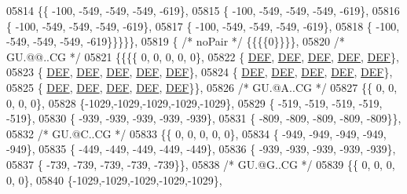 \begin{DoxyCode}
05814 \{\{ -100, -549, -549, -549, -619\},
05815 \{ -100, -549, -549, -549, -619\},
05816 \{ -100, -549, -549, -549, -619\},
05817 \{ -100, -549, -549, -549, -619\},
05818 \{ -100, -549, -549, -549, -619\}\}\}\}\},
05819 \{ \textcolor{comment}{/* noPair */} \{\{\{\{0\}\}\}\},
05820 \textcolor{comment}{/* GU.@@..CG */}
05821 \{\{\{\{    0,    0,    0,    0,    0\},
05822 \{  \mbox{\hyperlink{1_88_84__epars_8h_a397419fc12b37ed479c8abb9d444d843}{DEF}},  \mbox{\hyperlink{1_88_84__epars_8h_a397419fc12b37ed479c8abb9d444d843}{DEF}},  \mbox{\hyperlink{1_88_84__epars_8h_a397419fc12b37ed479c8abb9d444d843}{DEF}},  \mbox{\hyperlink{1_88_84__epars_8h_a397419fc12b37ed479c8abb9d444d843}{DEF}},  \mbox{\hyperlink{1_88_84__epars_8h_a397419fc12b37ed479c8abb9d444d843}{DEF}}\},
05823 \{  \mbox{\hyperlink{1_88_84__epars_8h_a397419fc12b37ed479c8abb9d444d843}{DEF}},  \mbox{\hyperlink{1_88_84__epars_8h_a397419fc12b37ed479c8abb9d444d843}{DEF}},  \mbox{\hyperlink{1_88_84__epars_8h_a397419fc12b37ed479c8abb9d444d843}{DEF}},  \mbox{\hyperlink{1_88_84__epars_8h_a397419fc12b37ed479c8abb9d444d843}{DEF}},  \mbox{\hyperlink{1_88_84__epars_8h_a397419fc12b37ed479c8abb9d444d843}{DEF}}\},
05824 \{  \mbox{\hyperlink{1_88_84__epars_8h_a397419fc12b37ed479c8abb9d444d843}{DEF}},  \mbox{\hyperlink{1_88_84__epars_8h_a397419fc12b37ed479c8abb9d444d843}{DEF}},  \mbox{\hyperlink{1_88_84__epars_8h_a397419fc12b37ed479c8abb9d444d843}{DEF}},  \mbox{\hyperlink{1_88_84__epars_8h_a397419fc12b37ed479c8abb9d444d843}{DEF}},  \mbox{\hyperlink{1_88_84__epars_8h_a397419fc12b37ed479c8abb9d444d843}{DEF}}\},
05825 \{  \mbox{\hyperlink{1_88_84__epars_8h_a397419fc12b37ed479c8abb9d444d843}{DEF}},  \mbox{\hyperlink{1_88_84__epars_8h_a397419fc12b37ed479c8abb9d444d843}{DEF}},  \mbox{\hyperlink{1_88_84__epars_8h_a397419fc12b37ed479c8abb9d444d843}{DEF}},  \mbox{\hyperlink{1_88_84__epars_8h_a397419fc12b37ed479c8abb9d444d843}{DEF}},  \mbox{\hyperlink{1_88_84__epars_8h_a397419fc12b37ed479c8abb9d444d843}{DEF}}\}\},
05826 \textcolor{comment}{/* GU.@A..CG */}
05827 \{\{    0,    0,    0,    0,    0\},
05828 \{-1029,-1029,-1029,-1029,-1029\},
05829 \{ -519, -519, -519, -519, -519\},
05830 \{ -939, -939, -939, -939, -939\},
05831 \{ -809, -809, -809, -809, -809\}\},
05832 \textcolor{comment}{/* GU.@C..CG */}
05833 \{\{    0,    0,    0,    0,    0\},
05834 \{ -949, -949, -949, -949, -949\},
05835 \{ -449, -449, -449, -449, -449\},
05836 \{ -939, -939, -939, -939, -939\},
05837 \{ -739, -739, -739, -739, -739\}\},
05838 \textcolor{comment}{/* GU.@G..CG */}
05839 \{\{    0,    0,    0,    0,    0\},
05840 \{-1029,-1029,-1029,-1029,-1029\},

\end{DoxyCode}
